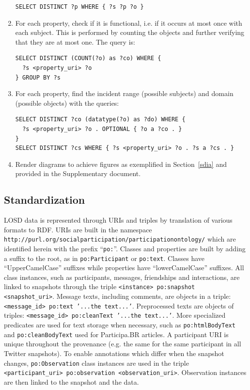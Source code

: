 \documentclass[data,datadescriptor,submit,moreauthors,pdftex]{Definitions/mdpi}
\newcommand{\te}[1] {\texttt{\footnotesize#1}}
\begin{document}
\begin{enumerate}
\begin{lstlisting}[language=spq]
SELECT DISTINCT ?p WHERE { ?s ?p ?o }
\end{lstlisting}
  \item For each property, check if it is functional, i.e. if it
        occurs at most once with each subject.
        This is performed by counting the objects and further verifying
        that they are at most one. The query is:
\begin{lstlisting}[language=spq]
SELECT DISTINCT (COUNT(?o) as ?co) WHERE {
  ?s <property_uri> ?o 
} GROUP BY ?s
\end{lstlisting}
  \item For each property, find the incident range (possible subjects) and domain (possible objects) with the
        queries:
\begin{lstlisting}[language=spq]
SELECT DISTINCT ?co (datatype(?o) as ?do) WHERE {
  ?s <property_uri> ?o . OPTIONAL { ?o a ?co . }
} 
SELECT DISTINCT ?cs WHERE { ?s <property_uri> ?o . ?s a ?cs . }
\end{lstlisting}
  \item Render diagrams to achieve figures as exemplified in Section~\ref{sdia} and provided in the Supplementary document.
\end{enumerate}

\subsection{Standardization}
LOSD data is represented through URIs and triples by translation of various formats to RDF.
URIs are built in the namespace \te{http://purl.org/socialparticipation/participationontology/}
which are identified herein with the prefix ``\te{po:}''.
Classes and properties are built by adding a suffix to the root, as in \te{po:Participant} or \te{po:text}.
Classes have ``UpperCamelCase'' suffixes while properties have ``lowerCamelCase'' suffixes.
All class instances, such as participants, messages, friendships and
interactions, are linked to
snapshots through the triple \te{<instance> po:snapshot <snapshot\_uri>}.
Message texts, including comments, are objects in a triple: \te{<message\_id> po:text '...the text...'}.
Preprocessed texts are objects of triples: \te{<message\_id> po:cleanText '...the text...'}.
More specialized predicates are used for text storage when necessary,
such as \te{po:htmlBodyText} and \te{po:cleanBodyText} used
for Participa.BR articles.
A participant URI is unique throughout the provenance (e.g. the same for
the same participant in all Twitter snapshots).
To enable annotations which differ when the snapshot changes,
\te{po:Observation} class instances are used in the triple
\te{<participant\_uri> po:observation <observation\_uri>}.
Observation instances are then linked to the snapshot and the
data.
\end{document}
